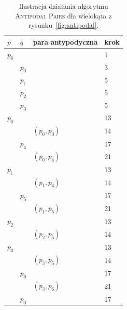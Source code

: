 \begin{table}[htb]
  \centering

  \begin{tabular}{llll}
    \toprule
    $p$ & $q$ & para antypodyczna & krok \\
    \midrule
    $p_6$ & & & 1 \\
    \midrule
    & $p_0$ & & 3 \\
    \midrule
    & $p_1$ & & 5 \\
    \midrule
    & $p_2$ & & 5 \\
    \midrule
    & $p_3$ & & 5 \\
    \midrule
    $p_0$& & & 13 \\
    \midrule
    & & $(p_0, p_3)$ & 14 \\
    \midrule
    & $p_4$ & & 17 \\
    \midrule
    & & $(p_0, p_4)$ & 21 \\
    \midrule
    $p_1$& & & 13 \\
    \midrule
    & & $(p_1, p_4)$ & 14 \\
    \midrule
    & $p_5$ & & 17 \\
    \midrule
    & & $(p_1, p_5)$ & 21 \\
    \midrule
    $p_2$& & & 13 \\
    \midrule
    & & $(p_2, p_5)$ & 14 \\
    \midrule
    $p_3$& & & 13 \\
    \midrule
    & & $(p_3, p_5)$ & 14 \\
    \midrule
    & $p_6$ & & 17 \\
    \midrule
    & & $(p_3, p_6)$ & 21 \\
    \midrule
    & $p_0$ & & 17 \\
    \bottomrule
  \end{tabular}

  \caption{Ilustracja działania algorytmu  \textsc{Antipodal Pairs} dla
    wielokąta z rysunku~\ref{fig:antipodal}.}
\end{table}

